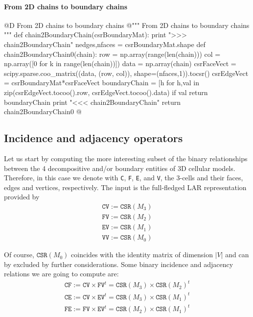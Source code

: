 \documentclass[11pt,oneside]{article}    %
\begin{document}
\paragraph{From 2D chains to boundary chains}
@D From 2D chains to boundary chains
@{""" From 2D chains to boundary chains """
def chain2BoundaryChain(csrBoundaryMat):
    print ">>> chain2BoundaryChain"
    nedges,nfaces = csrBoundaryMat.shape
    def chain2BoundaryChain0(chain):
        row = np.array(range(len(chain)))
        col = np.array([0 for k in range(len(chain))])
        data = np.array(chain)
        csrFaceVect = scipy.sparse.coo_matrix((data, (row, col)), shape=(nfaces,1)).tocsr()
        csrEdgeVect = csrBoundaryMat*csrFaceVect
        boundaryChain = [h for h,val in
            zip(csrEdgeVect.tocoo().row, csrEdgeVect.tocoo().data) if val%
        return boundaryChain
    print "<<< chain2BoundaryChain"
    return chain2BoundaryChain0
@}


\subsection{Incidence and adjacency operators}

Let us start by computing the more interesting subset of the binary relationships between the 4 decompositive and/or boundary entities of 3D cellular models.  Therefore, in this case we denote with \texttt{C}, \texttt{F}, \texttt{E}, and \texttt{V}, the 3-cells and their faces, edges and vertices, respectively.
The input is the full-fledged LAR representation provided by 
\begin{align}
\texttt{CV} := \texttt{CSR}(M_3) \\
\texttt{FV} := \texttt{CSR}(M_2) \\
\texttt{EV} := \texttt{CSR}(M_1) \\
\texttt{VV} := \texttt{CSR}(M_0) 
\end{align}

Of course, $\texttt{CSR}(M_0)$ coincides with the identity matrix of dimension $|V|$ and can by excluded by further considerations.
Some binary incidence and adjacency relations we are going to compute are:
\begin{align}
\texttt{CF} := \texttt{CV} \times \texttt{FV}^t = \texttt{CSR}(M_3)\times\texttt{CSR}(M_2)^t \\
\texttt{CE} := \texttt{CV} \times \texttt{EV}^t = \texttt{CSR}(M_3)\times\texttt{CSR}(M_1)^t \\
\texttt{FE} := \texttt{FV} \times \texttt{EV}^t = \texttt{CSR}(M_2)\times\texttt{CSR}(M_1)^t 
\end{align}
\end{document}
